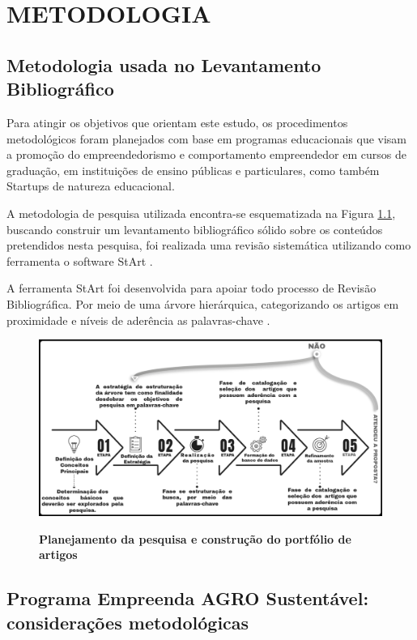 \chapter{METODOLOGIA}

\section{Metodologia usada no Levantamento Bibliográfico}


Para atingir os objetivos que orientam este estudo, os procedimentos metodológicos foram planejados com base em programas educacionais que visam a promoção do empreendedorismo e comportamento empreendedor em cursos de graduação, em instituições de ensino públicas e particulares, como também Startups de natureza educacional. 

A metodologia de pesquisa utilizada encontra-se esquematizada na Figura \ref{figura_29}, buscando construir um levantamento bibliográfico sólido sobre os conteúdos pretendidos nesta pesquisa, foi realizada uma revisão sistemática utilizando como ferramenta o software StArt \cite{lapes_start_2016}. 

A ferramenta StArt foi desenvolvida para apoiar todo processo de Revisão Bibliográfica. Por meio de uma árvore hierárquica, categorizando os artigos em proximidade e níveis de aderência as palavras-chave \cite{hernandes_avaliacao_2010}. 

\begin{figure}[H]
\centering
\caption{\textbf{Planejamento da pesquisa e construção do portfólio de artigos}}
\includegraphics[scale=0.25]{Imagens/fases_pesquisa_bibliografica.png}
\label{figura_29}
\end{figure}

\section{Programa Empreenda AGRO Sustentável: considerações metodológicas}


